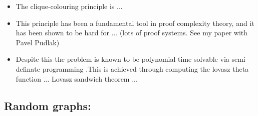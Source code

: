 
\begin{itemize}
    \item The clique-colouring principle is ... 
    \item This principle has been a fundamental tool in proof complexity theory, and it has been shown to be hard for ... (lots of proof systems. See my paper with Pavel Pudlak) \cite{Oliveira2019} 
    \item Despite this the problem is known to be polynomial time solvable via semi definate programming \cite{Goemans1997}.This is achieved through computing the lovasz theta function \cite{Lovasz1979} ... Lovasz sandwich theorem \cite{Knuth1994} ...

\end{itemize}

\subsection{Random graphs: }

